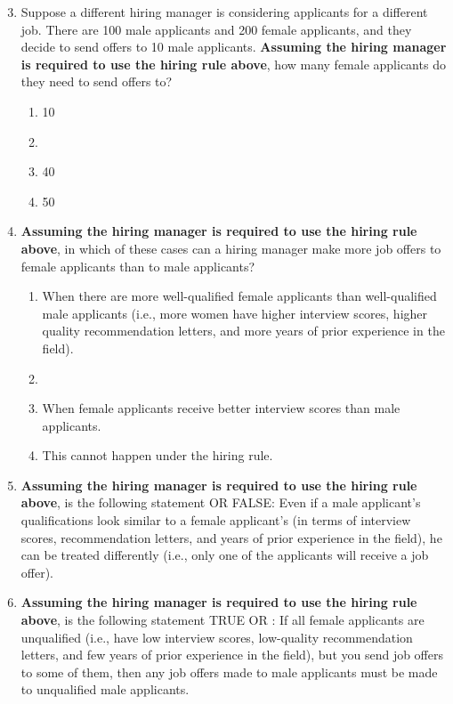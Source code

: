 \documentclass{article}
\newcommand{\correct}[1]{{\color{red}{#1}}}
\newcommand{\correct}[1]{{\color{red}{#1}}}
\begin{document}
\begin{enumerate}
    \setcounter{enumi}{2}
    \item Suppose a different hiring manager is considering applicants for a different job. There are 100 male applicants and 200 female applicants, and they decide to send offers to 10 male applicants. \textbf{Assuming the hiring manager is required to use the hiring rule above}, how many female applicants do they need to send offers to?
    \begin{enumerate}
        \item 10
        \item \correct{20}
        \item 40
        \item 50
    \end{enumerate}
    \item \textbf{Assuming the hiring manager is required to use the hiring rule above}, in which of these cases can a hiring manager make more job offers to female applicants than to male applicants?
    \begin{enumerate}
        \item When there are more well-qualified female applicants than well-qualified male applicants (i.e., more women have higher interview scores, higher quality recommendation letters, and more years of prior experience in the field). 
        \item \correct{When there are more female applicants than male applicants.}
        \item When female applicants receive better interview scores than male applicants.
        \item This cannot happen under the hiring rule.
    \end{enumerate}
    \item \textbf{Assuming the hiring manager is required to use the hiring rule above}, is the following statement \correct{TRUE} OR FALSE: Even if a male applicant’s qualifications look similar to a female applicant’s (in terms of interview scores, recommendation letters, and years of prior experience in the field), he can be treated differently (i.e., only one of the applicants will receive a job offer).
    \item \textbf{Assuming the hiring manager is required to use the hiring rule above}, is the following statement TRUE OR \correct{FALSE}: If all female applicants are unqualified (i.e., have low interview scores, low-quality recommendation letters, and few years of prior experience in the field), but you send job offers to some of them, then any job offers made to male applicants must be made to unqualified male applicants.

\end{enumerate}
\end{document}
